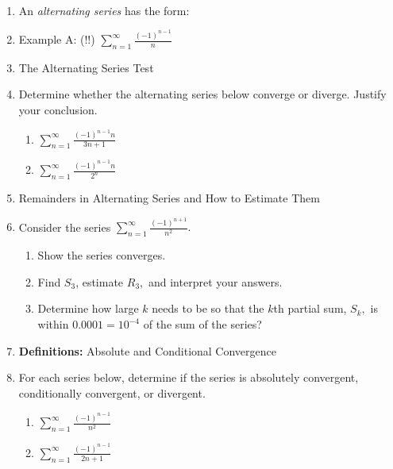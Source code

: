 \documentclass[11pt]{amsart}
\newcommand{\ds}{\displaystyle}
\begin{document}
\begin{center}
  \large
  \\
   
\end{center}

\begin{enumerate}
\item An \emph{alternating series} has the form: 

\vspace{2in}

\item Example A: (!!) $\ds  \sum_{n=1}^\infty \frac{(-1)^{n-1}}{n} $
\vfill

\item The Alternating Series Test
\vspace{2.5in}

\newpage
\item  Determine whether the alternating series below converge or diverge. Justify your conclusion.\\

\begin{enumerate}
\item $\ds  \sum_{n=1}^\infty \frac{(-1)^{n-1}n}{3n+1} $
\vfill

\item $\ds  \sum_{n=1}^\infty \frac{(-1)^{n-1}n}{2^n} $
\vfill
\end{enumerate}
\newpage
\item Remainders in Alternating Series and How to Estimate Them
\vfill
\item Consider the series $\ds \sum_{n=1}^\infty \frac{(-1)^{n+1}}{n^2}. $ 
	\begin{enumerate}
	\item Show the series converges.
	\vfill
	\item Find $S_3$, estimate $R_3,$ and interpret your answers.
	\vfill
	\item  Determine how large $k$ needs to be so that the $k$th partial sum, $S_k,$ is within $0.0001=10^{-4}$ of the sum of the series?
	\vfill
	\end{enumerate}
\vfill
\newpage
\item \textbf{Definitions:} Absolute and Conditional Convergence
\vfill

\item For each series below, determine if the series is absolutely convergent, conditionally convergent, or divergent.
	\begin{enumerate}
	\item $\ds  \sum_{n=1}^\infty \frac{(-1)^{n-1}}{n^2} $
	\vfill
	\item $\ds  \sum_{n=1}^\infty \frac{(-1)^{n-1}}{2n+1} $
	\vfill
	\end{enumerate}
\end{enumerate}
\end{document}
